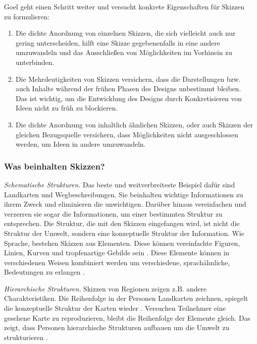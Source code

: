 \medskip Goel geht einen Schritt weiter und versucht konkrete Eigenschaften für Skizzen zu formulieren:
\begin{enumerate}
	\item Die dichte Anordnung von einzelnen Skizzen, die sich vielleicht auch nur gering unterscheiden, hilft eine Skizze gegebenenfalls in eine andere umzuwandeln und das Ausschließen von Möglichkeiten im Vorhinein zu unterbinden.
	\item Die Mehrdeutigkeiten von Skizzen versichern, dass die Darstellungen bzw. auch Inhalte während der frühen Phasen des Designs unbestimmt bleiben. Das ist wichtig, um die Entwicklung des Designs durch Konkretisieren von Ideen nicht zu früh zu blockieren.
	\item Die dichte Anordnung von inhaltlich ähnlichen Skizzen, oder auch Skizzen der gleichen Bezugsquelle versichern, dass Möglichkeiten nicht ausgeschlossen werden, um Ideen in andere umzuwandeln.
\end{enumerate}
\begin{flushright}\citep{Goel:1995}\end{flushright}

\subsubsection{Was beinhalten Skizzen?} 
\emph{Schematische Strukturen.} Das beste und weitverbreiteste Beispiel dafür sind Landkarten und Wegbeschreibungen. Sie beinhalten wichtige Informationen zu ihrem Zweck und eliminieren die unwichtigen. Darüber hinaus vereinfachen und verzerren sie sogar die Informationen, um einer bestimmten Struktur zu entsprechen. Die Struktur, die mit den Skizzen eingefangen wird, ist nicht die Struktur der Umwelt, sondern eine konzeptuelle Struktur der Information. Wie Sprache, bestehen Skizzen aus Elementen. Diese können vereinfachte Figuren, Linien, Kurven und tropfenartige Gebilde sein \citep{Tversky:2000}. Diese Elemente können in verschiedenen Weisen kombiniert werden um verschiedene, sprachähnliche, Bedeutungen zu erlangen \citep{Goodman:1968}.

\medskip \emph{Hierarchische Strukturen.} Skizzen von Regionen zeigen z.B. andere Charakteristiken. Die Reihenfolge in der Personen Landkarten zeichnen, spiegelt die konzeptuelle Struktur der Karten wieder \citep{Taylor:1992}. Versuchen Teilnehmer eine gesehene Karte zu reproduzieren, bleibt die Reihenfolge der Elemente gleich. Das zeigt, dass Personen hierarchische Strukturen aufbauen um die Umwelt zu strukturieren \citep{Tversky:2002}.

